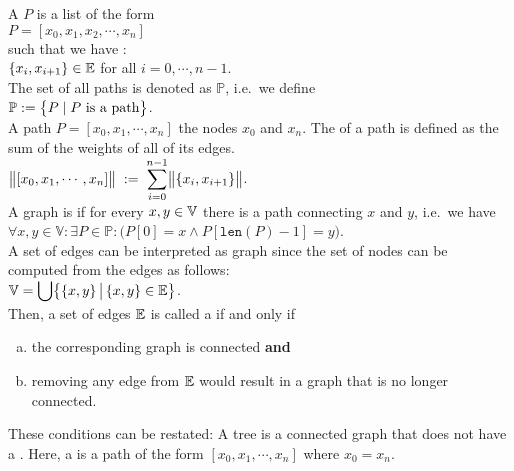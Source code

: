 \noindent
A  $P$ is a list of the form 
\\[0.2cm]
\hspace*{1.3cm} 
$P = [ x_0, x_1, x_2, \cdots, x_n ]$ 
\\[0.2cm]
such that we have : \\[0.2cm]
\hspace*{1.3cm}
$\{x_i,x_{i+1}\} \in {\mathbb E}$  \quad for all $i = 0, \cdots, n-1$.
\\[0.2cm]
The set of all paths is denoted as $\mathbb{P}$, i.e.~we define
\\[0.2cm]
\hspace*{1.3cm}
$\displaystyle \mathbb{P}  := \bigl\{ P \mid \mbox{$P$ is a path} \bigr\}$.
\\[0.2cm]
A path $P = [ x_0, x_1, \cdots, x_n]$  the nodes $x_0$ and $x_n$.  The  of a
path is defined as
the sum of the weights of all of its edges.  
\\[0.2cm]
\hspace*{1.3cm}
 $\displaystyle\bigl\|[x_0,x_1, \cdots, x_n]\bigr\| \;:=\; \sum\limits_{i=0}^{n-1} \bigl\|\{x_i,x_{i+1}\}\bigr\|$. 
\\[0.2cm]
A graph is  if for every $x,y \in {\mathbb V}$ there is a path connecting $x$ and $y$, i.e.~we have
\\[0.2cm]
\hspace*{1.3cm}
$\forall x, y \in \mathbb{V}: \exists P \in \mathbb{P}: \bigl(P[0] = x \wedge P[\texttt{len}(P)-1] = y\bigr)$.
\\[0.2cm]
A set of edges can be interpreted as graph since the set of nodes can be computed from the edges as
follows: 
\\[0.2cm]
\hspace*{1.3cm}
$\displaystyle{\mathbb V} = \bigcup \bigl\{\{x,y\} \,\big|\, \{x,y\} \in {\mathbb E} \bigr\}$.
\\[0.2cm]
Then, a set of edges ${\mathbb E}$ is called a  if and only if
\begin{enumerate}[(a)]
\item the corresponding graph is connected \quad \textbf{and}
\item removing any edge from ${\mathbb E}$ would result in a graph that is no longer connected.
\end{enumerate}
These conditions can be restated: A tree is a connected graph that does not have a .
Here, a  is a path of the form $[x_0, x_1, \cdots, x_n]$ where $x_0 = x_n$.  

